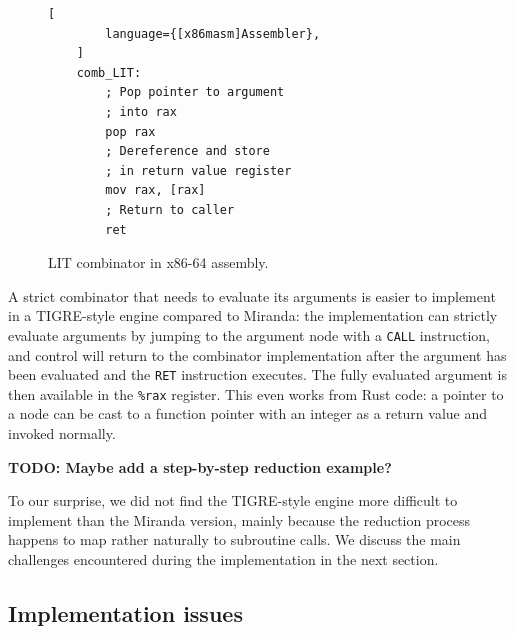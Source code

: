 \documentclass[conference]{IEEEtran}
\begin{document}
\begin{figure}
    \begin{lstlisting}[
        language={[x86masm]Assembler},
    ]
    comb_LIT:
        ; Pop pointer to argument
        ; into rax
        pop rax
        ; Dereference and store 
        ; in return value register
        mov rax, [rax]
        ; Return to caller
        ret
    \end{lstlisting}
    \centering
    \caption{LIT combinator in x86-64 assembly.}
    \label{fig:combLIT}
\end{figure}

A strict combinator that needs to evaluate its arguments is easier to implement in a TIGRE-style engine compared to Miranda: the implementation can strictly evaluate arguments by jumping to the argument node with a \texttt{CALL} instruction, and control will return to the combinator implementation after the argument has been evaluated and the \texttt{RET} instruction executes.
The fully evaluated argument is then available in the \texttt{\%rax} register.
This even works from Rust code: a pointer to a node can be cast to a function pointer with an integer as a return value and invoked normally.

\textbf{TODO: Maybe add a step-by-step reduction example?}

To our surprise, we did not find the TIGRE-style engine more difficult to implement than the Miranda version, mainly because the reduction process happens to map rather naturally to subroutine calls.
We discuss the main challenges encountered during the implementation in the next section.

\subsection{Implementation issues}
\end{document}
